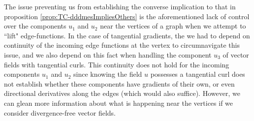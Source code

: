 The issue preventing us from establishing the converse implication to that in proposition \ref{prop:TC-dddmesImpliesOthers} is the aforementioned lack of control over the components $u_1$ and $u_2$ near the vertices of a graph when we attempt to ``lift" edge-functions.
In the case of tangential gradients, the we had to depend on continuity of the incoming edge functions at the vertex to circumnavigate this issue, and we also depend on this fact when handling the component $u_3$ of vector fields with tangential curls.
This continuity does not hold for the incoming components $u_1$ and $u_2$ since knowing the field $u$ possesses a tangential curl does not establish whether these components have gradients of their own, or even directional derivatives along the edges (which would also suffice).
However, we can glean more information about what is happening near the vertices if we consider divergence-free vector fields.
